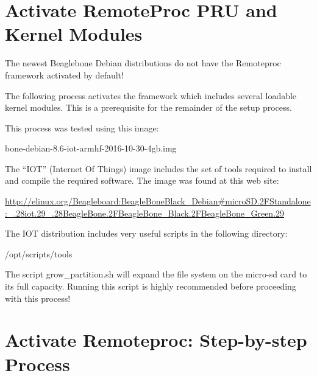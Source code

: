 \section{Activate RemoteProc PRU and Kernel Modules}

The newest Beaglebone Debian distributions do not have the Remoteproc framework activated by default!

The following process activates the framework which includes several loadable kernel modules.  This is a prerequisite for the remainder of the setup process.

This process was tested using this image:

bone-debian-8.6-iot-armhf-2016-10-30-4gb.img

The ``IOT'' (Internet Of Things) image includes the set of tools required to install and compile the required software.
The image was found at this web site:

\url{http://elinux.org/Beagleboard:BeagleBoneBlack_Debian#microSD.2FStandalone:_.28iot.29_.28BeagleBone.2FBeagleBone_Black.2FBeagleBone_Green.29}

The IOT distribution includes very useful scripts in the following directory:

/opt/scripts/tools

The script grow\_partition.sh will expand the file system on the micro-sd card to its full capacity.  Running this script is highly recommended before proceeding with this process!

\section{Activate Remoteproc: Step-by-step Process}

